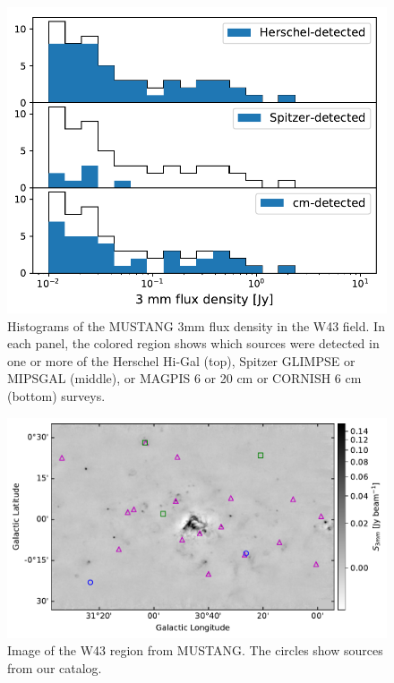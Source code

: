 \documentclass[twocolumn]{aastex62}
\begin{document}
\begin{figure}[htp]
    \includegraphics[scale=1]{figures/G31_dend_contour_thr4_minn20_mind1_detection_histograms.pdf}
\caption{Histograms of the MUSTANG 3mm flux density in the W43 field.  In each
panel, the colored region shows which sources were detected in one or more of
the Herschel Hi-Gal (top), Spitzer GLIMPSE or MIPSGAL (middle),
or MAGPIS 6 or 20 cm or CORNISH 6 cm (bottom) surveys.}
\label{fig:histogram}
\end{figure}

\begin{figure}[htp]
    \includegraphics[width=17cm]{figures/G31_overview_withcatalog.pdf}
\caption{Image of the W43 region from MUSTANG.  The circles show sources from our catalog.
}
\label{fig:w43overview}
\end{figure}
\end{document}
